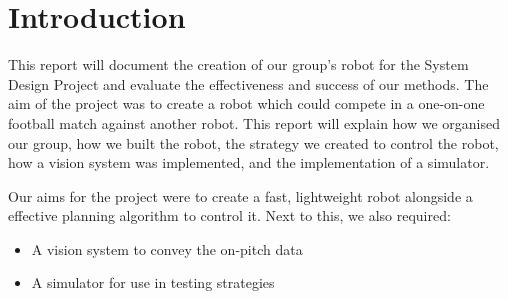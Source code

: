 \section{Introduction}

This report will document the creation of our group’s robot for the System Design Project and evaluate the effectiveness and success of our methods. 
The aim of the project was to create a robot which could compete in a one-on-one football match against another robot. This report will explain how we organised our group, how we built the robot, the strategy we created to control the robot, how a vision system was implemented, and the implementation of a simulator.

Our aims for the project were to create a fast, lightweight robot alongside a effective planning algorithm to control it. Next to this, we also required:
\begin{itemize}
\item A vision system to convey the on-pitch data
\item A simulator for use in testing strategies
\end{itemize}
